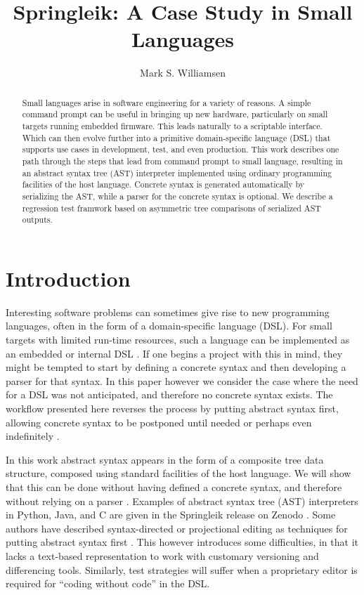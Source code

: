\documentclass[a4paper,10pt]{article}
\title{Springleik: A Case Study in Small Languages}
\author{Mark S. Williamsen}
\affil{FlexLink AB}
\begin{document}
\maketitle

\begin{abstract}

Small languages arise in software engineering for a variety of reasons. A simple command prompt can be useful in bringing up new hardware, particularly on small targets running embedded firmware. This leads naturally to a scriptable interface. Which can then evolve further into a primitive domain-specific language (DSL) that supports use cases in development, test, and even production. This work describes one path through the steps that lead from command prompt to small language, resulting in an abstract syntax tree (AST) interpreter implemented using ordinary programming facilities of the host language. Concrete syntax is generated automatically by serializing the AST, while a parser for the concrete syntax is optional. We describe a regression test framwork based on asymmetric tree comparisons of serialized AST outputs.

\end{abstract}

\graphicspath{ {./figures/} }

\section{Introduction}\label{Introduction}

Interesting software problems can sometimes give rise to new programming languages, often in the form of a domain-specific language (DSL). For small targets with limited run-time resources, such a language can be implemented as an embedded or internal DSL \cite{2012Hage}. If one begins a project with this in mind, they might be tempted to start by defining a concrete syntax and then developing a parser for that syntax. In this paper however we consider the case where the need for a DSL was not anticipated, and therefore no concrete syntax exists. The workflow presented here reverses the process by putting abstract syntax first, allowing concrete syntax to be postponed until needed or perhaps even indefinitely \cite{2010Fisler}.

In this work abstract syntax appears in the form of a composite tree data structure, composed using standard facilities of the host language. We will show that this can be done without having defined a concrete syntax, and therefore without relying on a parser \cite{2014Voelter}. Examples of abstract syntax tree (AST) interpreters in Python, Java, and C are given in the Springleik release on Zenodo \cite{ZenodoSpringleik}. Some authors have described syntax-directed or projectional editing as techniques for putting abstract syntax first \cite{1995Simonyi}. This however introduces some difficulties, in that it lacks a text-based representation to work with customary versioning and differencing tools. Similarly, test strategies will suffer when a proprietary editor is required for ``coding without code'' in the DSL.
\end{document}
